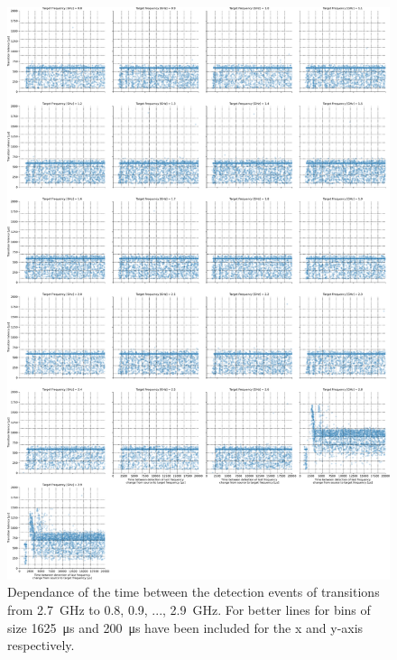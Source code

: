 \begin{figure}[]
    \centering
    \includegraphics[width=\columnwidth]{fig/ftalat_scatter_wait_transition_latency_hati_source_2.7.pdf}
    \caption{Dependance of the time between the detection events of transitions from \SI{2.7}{\GHz} to \SI{0.8}{}, \SI{0.9}{}, ..., \SI{2.9}{\GHz}. For better lines for bins of size \SI{1625}{\us} and \SI{200}{\us} have been included for the x and y-axis respectively.}
\end{figure}

